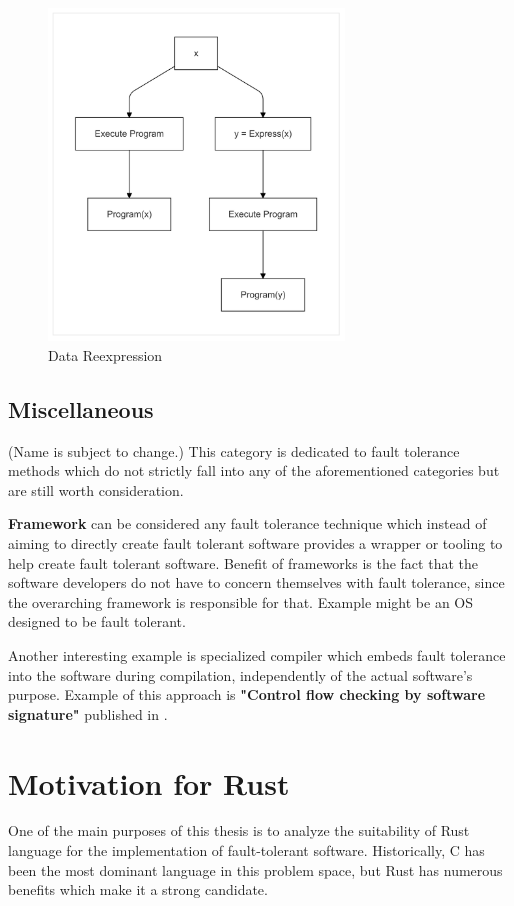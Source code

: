 \documentclass[12pt, letterpaper]{article}
\begin{document}
\begin{figure}[hbt]
    \centering
    \includegraphics[width=0.7\textwidth]{diagrams/data_div/reexpress.png}
    \caption{Data Reexpression}
    \label{fig:data_rex}
\end{figure}

\subsection{Miscellaneous}
(Name is subject to change.)
This category is dedicated to fault tolerance methods which do not strictly fall into any of the aforementioned categories but are still worth consideration.

\textbf{Framework} can be considered any fault tolerance technique which instead of aiming to directly create fault tolerant software provides a wrapper or tooling to help create fault tolerant software. Benefit of frameworks is the fact that the software developers do not have to concern themselves with fault tolerance, since the overarching framework is responsible for that. Example might be an OS designed to be fault tolerant.

Another interesting example is specialized compiler which embeds fault tolerance into the software during compilation, independently of the actual software's purpose. Example of this approach is \textbf{"Control flow checking by software signature"} published in \cite{994926}.

\section{Motivation for Rust}
One of the main purposes of this thesis is to analyze the suitability of Rust language for the implementation of fault-tolerant software. Historically, C has been the most dominant language in this problem space, but Rust has numerous benefits which make it a strong candidate.
\end{document}
